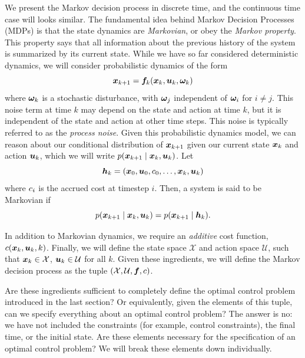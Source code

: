 We present the Markov decision process in discrete time, and the continuous time case will looks similar. The fundamental idea behind Markov Decision Processes (MDPs) is that the state dynamics are \textit{Markovian}, or obey the \textit{Markov property}. This property says that all information about the previous history of the system is summarized by its current state. While we have so far considered deterministic dynamics, we will consider probabilistic dynamics of the form 
\begin{equation}
    \bm{x}_{k+1} = \bm{f}_k(\bm{x}_k, \bm{u}_k, \bm{\omega}_k)
\end{equation}
where $\bm{\omega}_k$ is a stochastic disturbance, with $\bm{\omega}_j$ independent of $\bm{\omega}_i$ for $i \neq j$. This noise term at time $k$ may depend on the state and action at time $k$, but it is independent of the state and action at other time steps. This noise is typically referred to as the \textit{process noise}. Given this probabilistic dynamics model, we can reason about our conditional distribution of $\bm{x}_{k+1}$ given our current state $\bm{x}_k$ and action $\bm{u}_k$, which we will write $p(\bm{x}_{k+1} \mid \bm{x}_k, \bm{u}_k)$. Let 
\begin{equation}
\bm{h}_k =(\bm{x}_0, \bm{u}_0, c_0, \ldots, \bm{x}_k, \bm{u}_k)    
\end{equation} 
where $c_i$ is the accrued cost at timestep $i$. Then, a system is said to be Markovian if
\begin{equation}
    p(\bm{x}_{k+1} \mid \bm{x}_k, \bm{u}_k) = p(\bm{x}_{k+1} \mid \bm{h}_k).
\end{equation}

In addition to Markovian dynamics, we require an \textit{additive} cost function, $c(\bm{x}_k, \bm{u}_k, k)$. Finally, we will define the state space $\mathcal{X}$ and action space $\mathcal{U}$, such that $\bm{x}_k \in \mathcal{X}$, $\bm{u}_k \in \mathcal{U}$ for all $k$. Given these ingredients, we will define the Markov decision process as the tuple $(\mathcal{X}, \mathcal{U}, \bm{f}, c)$. 

Are these ingredients sufficient to completely define the optimal control problem introduced in the last section? Or equivalently, given the elements of this tuple, can we specify everything about an optimal control problem? The answer is no: we have not included the constraints (for example, control constraints), the final time, or the initial state. Are these elements necessary for the specification of an optimal control problem? We will break these elements down individually.

